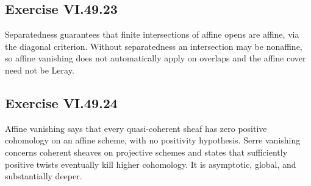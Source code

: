 \subsection*{Exercise VI.49.23}
\begin{solution}
Separatedness guarantees that finite intersections of affine opens are affine, via the diagonal criterion.  Without separatedness an intersection may be nonaffine, so affine vanishing does not automatically apply on overlaps and the affine cover need not be Leray.
\end{solution}

\subsection*{Exercise VI.49.24}
\begin{solution}
Affine vanishing says that every quasi-coherent sheaf has zero positive cohomology on an affine scheme, with no positivity hypothesis.  Serre vanishing concerns coherent sheaves on projective schemes and states that sufficiently positive twists eventually kill higher cohomology.  It is asymptotic, global, and substantially deeper.
\end{solution}

